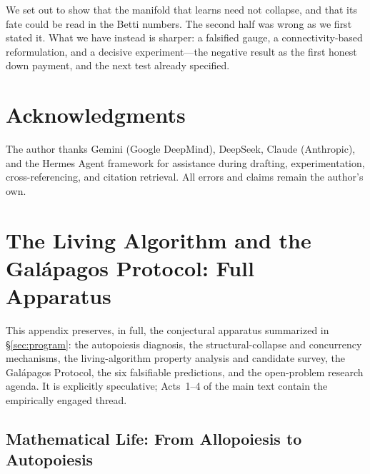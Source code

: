 \documentclass{article}
\begin{document}
We set out to show that the manifold that learns need not collapse, and that its fate could be read in
the Betti numbers. The second half was wrong as we first stated it. What we have instead is sharper: a
falsified gauge, a connectivity-based reformulation, and a decisive experiment---the negative result
as the first honest down payment, and the next test already specified.


\section*{Acknowledgments}

The author thanks Gemini (Google DeepMind), DeepSeek, Claude (Anthropic), and the Hermes Agent framework for assistance during drafting, experimentation, cross-referencing, and citation retrieval. All errors and claims remain the author's own.




\appendix

\section{The Living Algorithm and the Gal\'apagos Protocol: Full Apparatus}
\label{app:apparatus}
\noindent This appendix preserves, in full, the conjectural apparatus summarized in 
\S\ref{sec:program}: the autopoiesis diagnosis, the structural-collapse and concurrency 
mechanisms, the living-algorithm property analysis and candidate survey, the Gal\'apagos 
Protocol, the six falsifiable predictions, and the open-problem research agenda. It is 
explicitly speculative; Acts~1--4 of the main text contain the empirically engaged thread.

\subsection{Mathematical Life: From Allopoiesis to Autopoiesis}
\label{sec:autopoiesis-main}
\end{document}
